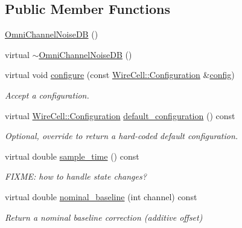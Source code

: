 \subsection*{Public Member Functions}
\begin{DoxyCompactItemize}
\item 
\hyperlink{class_wire_cell_1_1_sig_proc_1_1_omni_channel_noise_d_b_aa1e78fefc94fd11765fa17fbccf2d786}{Omni\+Channel\+Noise\+DB} ()
\item 
virtual \hyperlink{class_wire_cell_1_1_sig_proc_1_1_omni_channel_noise_d_b_a64273a955c13ca79dc40939d2684b1ff}{$\sim$\+Omni\+Channel\+Noise\+DB} ()
\item 
virtual void \hyperlink{class_wire_cell_1_1_sig_proc_1_1_omni_channel_noise_d_b_ac3cd4bc917fb51f767908130f507defd}{configure} (const \hyperlink{namespace_wire_cell_a9f705541fc1d46c608b3d32c182333ee}{Wire\+Cell\+::\+Configuration} \&\hyperlink{class_wire_cell_1_1_sig_proc_1_1_omni_channel_noise_d_b_acc904d0a6472acede55bd40ef8b6cd01}{config})
\begin{DoxyCompactList}\small\item\em Accept a configuration. \end{DoxyCompactList}\item 
virtual \hyperlink{namespace_wire_cell_a9f705541fc1d46c608b3d32c182333ee}{Wire\+Cell\+::\+Configuration} \hyperlink{class_wire_cell_1_1_sig_proc_1_1_omni_channel_noise_d_b_af33aa262d6af04f4252abef453156799}{default\+\_\+configuration} () const
\begin{DoxyCompactList}\small\item\em Optional, override to return a hard-\/coded default configuration. \end{DoxyCompactList}\item 
virtual double \hyperlink{class_wire_cell_1_1_sig_proc_1_1_omni_channel_noise_d_b_a33769e729aab08e5320647cd4c04304c}{sample\+\_\+time} () const
\begin{DoxyCompactList}\small\item\em F\+I\+X\+ME\+: how to handle state changes? \end{DoxyCompactList}\item 
virtual double \hyperlink{class_wire_cell_1_1_sig_proc_1_1_omni_channel_noise_d_b_a7d762e341143dea15eb2d8f57aac9c86}{nominal\+\_\+baseline} (int channel) const
\begin{DoxyCompactList}\small\item\em Return a nominal baseline correction (additive offset) \end{DoxyCompactList}\item 

\end{DoxyCompactItemize}
